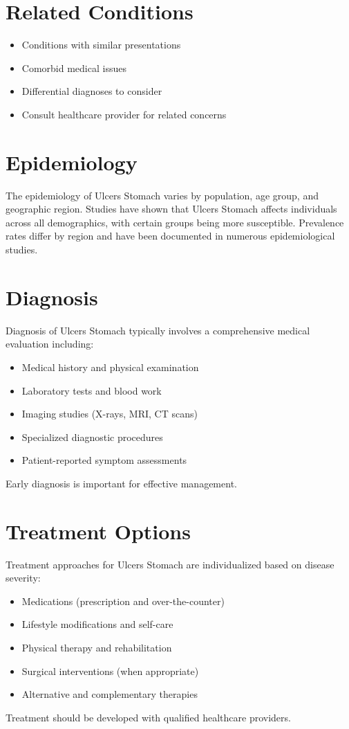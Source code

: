 \section*{Related Conditions}
\begin{itemize}
  \item Conditions with similar presentations
  \item Comorbid medical issues
  \item Differential diagnoses to consider
  \item Consult healthcare provider for related concerns
\end{itemize}

\section*{Epidemiology}
The epidemiology of Ulcers Stomach varies by population, age group, and geographic region. Studies have shown that Ulcers Stomach affects individuals across all demographics, with certain groups being more susceptible. Prevalence rates differ by region and have been documented in numerous epidemiological studies.

\section*{Diagnosis}
Diagnosis of Ulcers Stomach typically involves a comprehensive medical evaluation including:
\begin{itemize}
  \item Medical history and physical examination
  \item Laboratory tests and blood work
  \item Imaging studies (X-rays, MRI, CT scans)
  \item Specialized diagnostic procedures
  \item Patient-reported symptom assessments
\end{itemize}
Early diagnosis is important for effective management.

\section*{Treatment Options}
Treatment approaches for Ulcers Stomach are individualized based on disease severity:
\begin{itemize}
  \item Medications (prescription and over-the-counter)
  \item Lifestyle modifications and self-care
  \item Physical therapy and rehabilitation
  \item Surgical interventions (when appropriate)
  \item Alternative and complementary therapies
\end{itemize}
Treatment should be developed with qualified healthcare providers.

